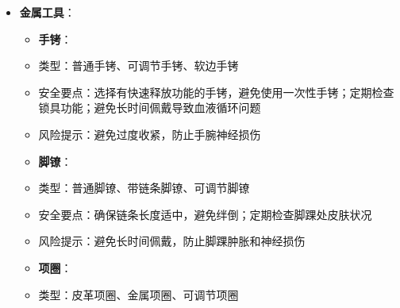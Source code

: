 \documentclass[12pt,UTF8]{ctexbook}
\begin{document}
\begin{itemize}
\begin{itemize}
\begin{itemize}
\begin{itemize}
          \item \textbf{棉绳}：
            \item 特点：非常柔软，触感舒适，颜色多样
            \item 优点：对皮肤友好，适合敏感肌肤，不易造成勒痕
            \item 缺点：强度较低，易打滑，吸水性强（湿水后易拉伸）
            \item 适用场景：温柔的捆绑、初学者练习、敏感部位捆绑
        \item \textbf{合成纤维绳索}：
          \item \textbf{尼龙绳}：
            \item 特点：强度高，光滑耐用，颜色丰富
            \item 优点：不易磨损，易于清洁，湿水后强度不变
            \item 缺点：摩擦力小，易打滑，透气性差
            \item 适用场景：西方绳缚、快速捆绑、户外场景
          \item \textbf{聚酯绳}：
            \item 特点：类似尼龙绳，但更硬，熔点更高
            \item 优点：强度高，耐高温，不易变形
            \item 缺点：触感较硬，透气性差
            \item 适用场景：特殊场景捆绑、需要高强度的捆绑
        \end{itemize}
      \item \textbf{金属工具}：
        \begin{itemize}
        \item \textbf{手铐}：
          \item 类型：普通手铐、可调节手铐、软边手铐
          \item 安全要点：选择有快速释放功能的手铐，避免使用一次性手铐；定期检查锁具功能；避免长时间佩戴导致血液循环问题
          \item 风险提示：避免过度收紧，防止手腕神经损伤
        \item \textbf{脚镣}：
          \item 类型：普通脚镣、带链条脚镣、可调节脚镣
          \item 安全要点：确保链条长度适中，避免绊倒；定期检查脚踝处皮肤状况
          \item 风险提示：避免长时间佩戴，防止脚踝肿胀和神经损伤
        \item \textbf{项圈}：
          \item 类型：皮革项圈、金属项圈、可调节项圈

\end{itemize}
\end{itemize}
\end{itemize}
\end{itemize}
\end{document}
